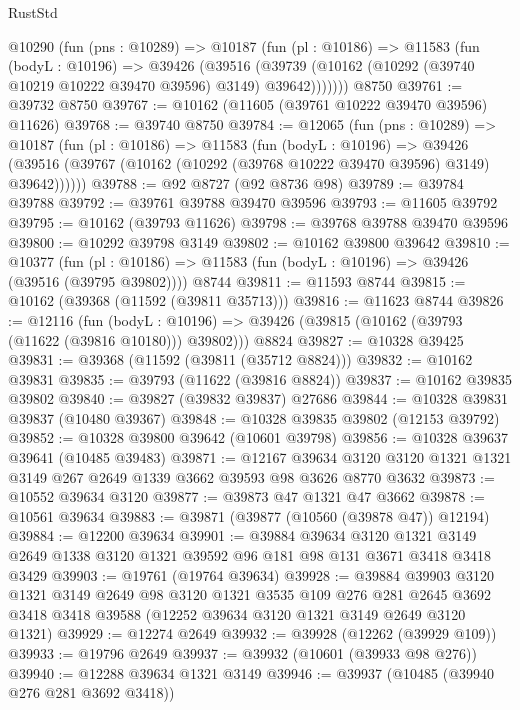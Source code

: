 \begin{lexlean}{RustStd}
\begin{coremodule}
    @10290
      (fun (pns : @10289) =>
      @10187
        (fun (pl : @10186) =>
        @11583
          (fun (bodyL : @10196) =>
          @39426
            (@39516
              (@39739 (@10162 (@10292 (@39740 @10219 @10222 @39470 @39596) @3149) @39642)))))))
    @8750
@39761 := @39732 @8750
@39767 := @10162 (@11605 (@39761 @10222 @39470 @39596) @11626)
@39768 := @39740 @8750
@39784 := @12065
    (fun (pns : @10289) =>
    @10187
      (fun (pl : @10186) =>
      @11583
        (fun (bodyL : @10196) =>
        @39426 (@39516 (@39767 (@10162 (@10292 (@39768 @10222 @39470 @39596) @3149) @39642))))))
@39788 := @92 @8727 (@92 @8736 @98)
@39789 := @39784 @39788
@39792 := @39761 @39788 @39470 @39596
@39793 := @11605 @39792
@39795 := @10162 (@39793 @11626)
@39798 := @39768 @39788 @39470 @39596
@39800 := @10292 @39798 @3149
@39802 := @10162 @39800 @39642
@39810 := @10377
    (fun (pl : @10186) => @11583 (fun (bodyL : @10196) => @39426 (@39516 (@39795 @39802))))
    @8744
@39811 := @11593 @8744
@39815 := @10162 (@39368 (@11592 (@39811 @35713)))
@39816 := @11623 @8744
@39826 := @12116
    (fun (bodyL : @10196) => @39426 (@39815 (@10162 (@39793 (@11622 (@39816 @10180))) @39802)))
    @8824
@39827 := @10328 @39425
@39831 := @39368 (@11592 (@39811 (@35712 @8824)))
@39832 := @10162 @39831
@39835 := @39793 (@11622 (@39816 @8824))
@39837 := @10162 @39835 @39802
@39840 := @39827 (@39832 @39837) @27686
@39844 := @10328 @39831 @39837 (@10480 @39367)
@39848 := @10328 @39835 @39802 (@12153 @39792)
@39852 := @10328 @39800 @39642 (@10601 @39798)
@39856 := @10328 @39637 @39641 (@10485 @39483)
@39871 := @12167
    @39634
    @3120
    @3120
    @1321
    @1321
    @3149
    @267
    @2649
    @1339
    @3662
    @39593
    @98
    @3626
    @8770
    @3632
@39873 := @10552 @39634 @3120
@39877 := @39873 @47 @1321 @47 @3662
@39878 := @10561 @39634
@39883 := @39871 (@39877 (@10560 (@39878 @47)) @12194)
@39884 := @12200 @39634
@39901 := @39884
    @39634
    @3120
    @1321
    @3149
    @2649
    @1338
    @3120
    @1321
    @39592
    @96
    @181
    @98
    @131
    @3671
    @3418
    @3418
    @3429
@39903 := @19761 (@19764 @39634)
@39928 := @39884
    @39903
    @3120
    @1321
    @3149
    @2649
    @98
    @3120
    @1321
    @3535
    @109
    @276
    @281
    @2645
    @3692
    @3418
    @3418
    @39588
    (@12252 @39634 @3120 @1321 @3149 @2649 @3120 @1321)
@39929 := @12274 @2649
@39932 := @39928 (@12262 (@39929 @109))
@39933 := @19796 @2649
@39937 := @39932 (@10601 (@39933 @98 @276))
@39940 := @12288 @39634 @1321 @3149
@39946 := @39937 (@10485 (@39940 @276 @281 @3692 @3418))

\end{coremodule}
\end{lexlean}

